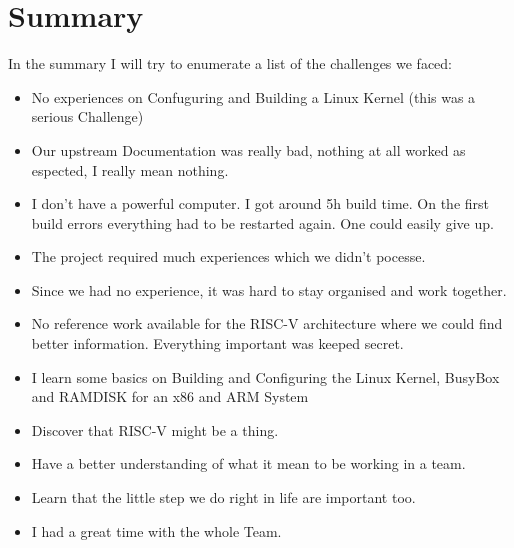 \documentclass[a4paper,11pt]{report}
\begin{document}
\chapter{Summary}

  In the summary I will try to enumerate a list of the challenges we faced:
    \begin{itemize}
      \item No experiences on Confuguring and Building a Linux Kernel (this was a serious Challenge)
      \item Our upstream Documentation was really bad, nothing at all worked as espected, I really mean nothing.
      \item I don't have a powerful computer. I got around 5h build time. On the first build errors everything had
      to be restarted again. One could easily give up.
      \item The project required much experiences which we didn't pocesse.
      \item Since we had no experience, it was hard to stay organised and work together.
      \item No reference work available for the RISC-V architecture where we could find
      better information. Everything important was keeped secret.
      
    \end{itemize}
    
    \begin{itemize}
      \item I learn some basics on Building and Configuring the Linux Kernel, BusyBox and RAMDISK for an x86 and ARM System
      \item Discover that RISC-V might be a thing.
      \item Have a better understanding of what it mean to be working in a team.
      \item Learn that the little step we do right in life are important too.
      \item I had a great time with the whole Team.
    \end{itemize}
\end{document}
